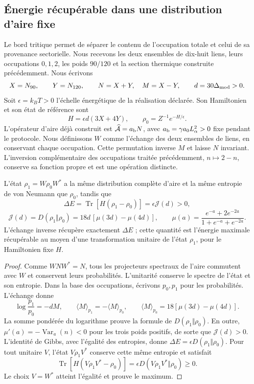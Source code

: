 \subsection{Énergie récupérable dans une distribution d’aire fixe}
\label{ins29:v:orientacion}

Le bord tritique permet de séparer le contenu de l’occupation totale
et celui de sa provenance sectorielle. Nous recevons les deux ensembles de
dix-huit liens, leurs occupations \(0,1,2\), les poids \(90/120\)
et la section thermique construite précédemment. Nous écrivons
\[
 X=N_{90},\qquad Y=N_{120},\qquad N=X+Y,\quad M=X-Y,
 \qquad d=30\Delta_{\rm mod}>0.
\]
Soit \(\epsilon=k_BT>0\) l’échelle énergétique de la réalisation
déclarée. Son Hamiltonien et son état de référence sont
\[
 H=\epsilon d(3X+4Y),\qquad
 \rho_0=Z^{-1}e^{-H/\epsilon}.
\]
L’opérateur d’aire déjà construit est
\(\widehat{\mathcal A}=a_{\rm b}N\), avec
\(a_{\rm b}=\gamma a_0L_\alpha^2>0\) fixe pendant le protocole.
Nous définissons \(W\) comme l’échange des deux ensembles de liens,
en conservant chaque occupation. Cette permutation inverse \(M\) et laisse
\(N\) invariant. L’inversion complémentaire des occupations traitée
précédemment, \(n\mapsto2-n\), conserve sa fonction propre et est une
opération distincte.

\begin{proposition}
\label{ins29:v:respuesta}
L’état \(\rho_1=W\rho_0W^*\) a la même distribution complète
d’aire et la même entropie de von Neumann que \(\rho_0\), tandis que
\[
 \Delta E=\operatorname{Tr}[H(\rho_1-\rho_0)]
 =\epsilon\mathcal J(d)>0,
\]
\[
 \mathcal J(d)=D(\rho_1\Vert\rho_0)
 =18d\,[\mu(3d)-\mu(4d)],\qquad
 \mu(a)=\frac{e^{-a}+2e^{-2a}}{1+e^{-a}+e^{-2a}}.
\]
L’échange inverse récupère exactement \(\Delta E\) ; cette quantité
est l’énergie maximale récupérable au moyen d’une transformation unitaire
de l’état \(\rho_1\), pour le Hamiltonien fixe \(H\).
\end{proposition}
\begin{proof}
Comme \(WNW^*=N\), tous les projecteurs spectraux de l’aire commutent
avec \(W\) et conservent leurs probabilités. L’unitarité conserve le
spectre de l’état et son entropie. Dans la base des occupations, écrivons
\(p_0,p_1\) pour les probabilités. L’échange donne
\[
 \log\frac{p_1}{p_0}=-dM,\qquad
 \langle M\rangle_{p_1}=-\langle M\rangle_{p_0},\qquad
 \langle M\rangle_{p_0}=18[\mu(3d)-\mu(4d)].
\]
La somme pondérée du logarithme prouve la formule de
\(D(\rho_1\Vert\rho_0)\). En outre,
\(\mu'(a)=-\operatorname{Var}_a(n)<0\) pour les trois poids positifs,
de sorte que \(\mathcal J(d)>0\).
L’identité de Gibbs, avec l’égalité des entropies, donne
\(\Delta E=\epsilon D(\rho_1\Vert\rho_0)\).
Pour tout unitaire \(V\), l’état \(V\rho_1V^*\) conserve cette
même entropie et satisfait
\[
 \operatorname{Tr}[H(V\rho_1V^*-\rho_0)]
 =\epsilon D(V\rho_1V^*\Vert\rho_0)\geq0.
\]
Le choix \(V=W^*\) atteint l’égalité et prouve le maximum.
\end{proof}

